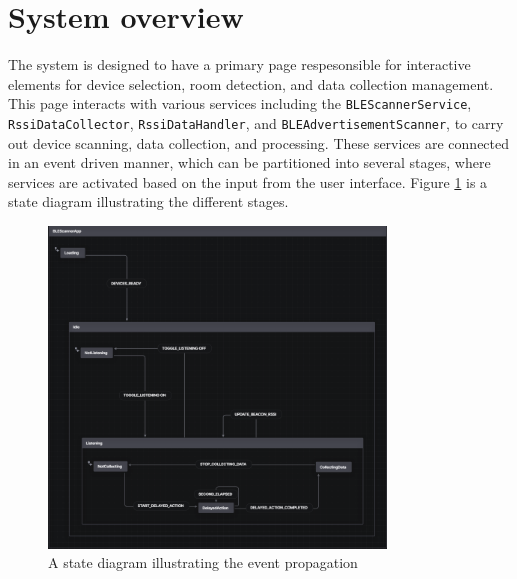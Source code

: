 \section{System overview}
The system is designed to have a primary page respesonsible for interactive elements for device selection, room detection, and data collection management. This page interacts with various services including the \texttt{BLEScannerService}, \texttt{RssiDataCollector}, \texttt{RssiDataHandler}, and \texttt{BLEAdvertisementScanner}, to carry out device scanning, data collection, and processing.
These services are connected in an event driven manner, which can be partitioned into several stages, where services are activated based on the input from the user interface. 
Figure \ref{fig:StateDiagram} is a state diagram illustrating the different stages. 

\begin{figure}[H]
    \centering
    \includegraphics[width=0.8\textwidth]{images/StateDiagram.png}
    \caption{A state diagram illustrating the event propagation}
    \label{fig:StateDiagram}
\end{figure}

